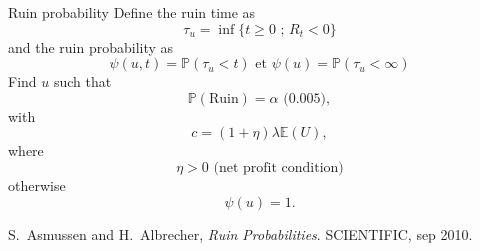 \documentclass{beamer}
\begin{document}
\begin{frame}{Ruin probability}
\scriptsize
Define the ruin time as
$$
\tau_u = \inf\{t\geq0\text{ ; }R_t <0\}
$$
and the ruin probability as
$$
\psi(u,t) = \mathbb{P}(\tau_u < t)\text{ et }\psi(u) = \mathbb{P}(\tau_u < \infty)
$$
Find $u$ such that 
$$
\mathbb{P}(\text{Ruin}) = \alpha\text{ (0.005)},
$$
with
$$
c=(1+\eta)\lambda\mathbb{E}(U),
$$
where 
$$\eta>0\text{ (net profit condition)}$$  
otherwise 
$$\psi(u)=1.$$

\tiny
\begin{thebibliography}{1}

S.~Asmussen and H.~Albrecher, {\em Ruin Probabilities}.
 {SCIENTIFIC}, sep 2010.

\end{thebibliography}

\end{frame}
\end{document}
